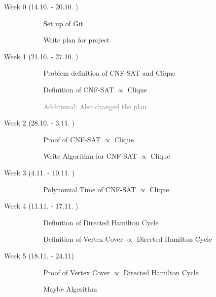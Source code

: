 \documentclass[11pt,a4paper]{scrartcl}
\begin{document}
	\begin{description}
		\item[Week 0 (14.10. - 20.10. )] \hfill
		\begin{description}
			\item[\textcolor{Green}{\CheckedBox}] Set up of Git
			\item[\textcolor{Green}{\CheckedBox}] Write plan for project 
		\end{description}
		\item[ Week 1 (21.10. - 27.10. )] \hfill 
		\begin{description}
			\item[\textcolor{Green}{\CheckedBox}] Problem definition of CNF-SAT and Clique
			\item[\textcolor{Green}{\CheckedBox}] Definition of CNF-SAT $\varpropto$ Clique
			\item[] \textcolor{gray}{Additional: Also changed the plan}
		\end{description}
		\item[Week 2 (28.10. - 3.11. )] \hfill
		\begin{description}
			\item[\textcolor{Green}{\CheckedBox}]Proof of CNF-SAT $\varpropto$ Clique
			\item[\textcolor{Green}{\CheckedBox}] Write Algorithm for CNF-SAT $\varpropto$ Clique
			\end{description}
		\item[Week 3 (4.11. - 10.11. )]\hfill \begin{description}
			\item[\textcolor{Green}{\CheckedBox}] Polynomial Time of CNF-SAT $\varpropto$ Clique
		\end{description} 
		\item[Week 4 (11.11. - 17.11. )] \hfill
		\begin{description}
			\item[\Square] Definition of  Directed Hamilton Cycle
			\item[\Square] Definition of Vertex Cover $\varpropto$ Directed Hamilton Cycle
		\end{description} 
		\item[Week 5 (18.11. - 24.11)] \hfill
		\begin{description}
			\item[\Square] Proof of Vertex Cover $\varpropto$ Directed Hamilton Cycle
			\item[\Square] Maybe Algorithm
		\end{description}

\end{description}
\end{document}
